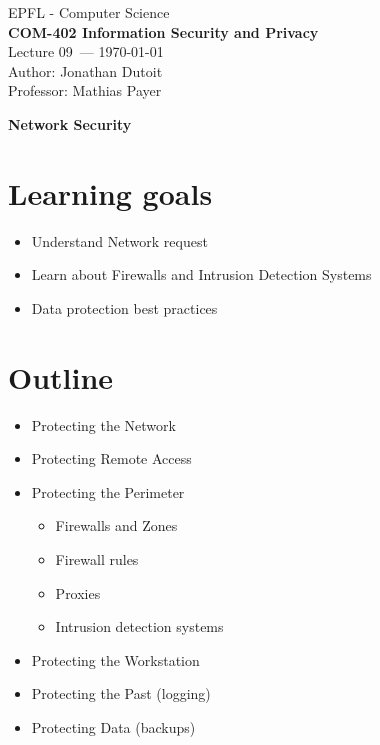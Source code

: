 \documentclass[11pt]{article}
\newcommand{\coursename}{COM-402 Information Security and Privacy}
\newcommand{\lecturenum}{09}
\newcommand{\lecturedate}{\today}
\newcommand{\professor}{Mathias Payer}
\begin{document}
\begin{center}
  {\large EPFL - Computer Science} \\[0.5em]
  {\Large \textbf{\coursename}} \\[0.5em]
  {\large Lecture \lecturenum\ --- \lecturedate} \\[0.5em]
  {\large Author: Jonathan Dutoit} \\[0.5em]
  {\large Professor: \professor} \\[0.5em]
\end{center}

\vspace{2cm}
\begin{center}
  {\LARGE \textbf{Network Security}}
\end{center}

\vspace{1cm}

\section*{Learning goals}

\begin{itemize}
	\item Understand Network request
	\item Learn about Firewalls and Intrusion Detection Systems
	\item Data protection best practices
\end{itemize}

\section*{Outline}

\begin{itemize}
	\item Protecting the Network
	\item Protecting Remote Access
	\item Protecting the Perimeter
		\begin{itemize}
			\item Firewalls and Zones
			\item Firewall rules
			\item Proxies
			\item Intrusion detection systems
		\end{itemize}
	\item Protecting the Workstation
	\item Protecting the Past (logging)
	\item Protecting Data (backups)
\end{itemize}
\end{document}
